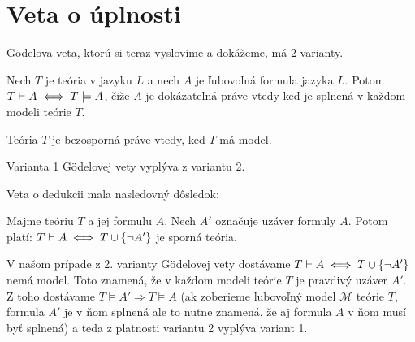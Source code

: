 \section{Veta o úplnosti}

G\"odelova veta, ktorú si teraz vyslovíme a dokážeme, má 2 varianty.

\begin{veta}
    Nech $T$ je teória v jazyku $L$ a nech $A$ je
    ľubovoľná formula jazyka $L$. Potom $T \vdash A \iff T \models A$,
    čiže $A$ je dokázateľná práve vtedy keď
    je splnená v každom modeli teórie $T$.
\end{veta}

\begin{veta}
    Teória $T$ je bezosporná práve vtedy, ked $T$ má model.
\end{veta}

\begin{poznamka}
    Varianta 1 G\"odelovej vety vyplýva z variantu 2.
\end{poznamka}

\begin{dokaz}[Poznámky]
    Veta o dedukcii mala nasledovný dôsledok:

    Majme teóriu $T$ a jej formulu $A$. Nech $A'$ označuje uzáver
    formuly $A$.
    Potom platí: $T \vdash A \iff T \cup \{ \neg A' \}$ je sporná
    teória.

    V našom prípade z 2. varianty G\"odelovej vety dostávame
    $T \vdash A \iff T \cup \{ \neg A' \}$ nemá model.
    Toto znamená, že v každom modeli teórie $T$ je pravdivý uzáver $A'$.
    Z toho dostávame $T \models A' \Rightarrow T \models A$
    (ak zoberieme ľubovoľný model $\mathcal{M}$ teórie $T$, formula
    $A'$ je v ňom splnená ale to nutne znamená, že aj formula $A$ v
    ňom musí byť splnená)
    a teda z platnosti variantu 2 vyplýva variant 1.
    \\
\end{dokaz}

